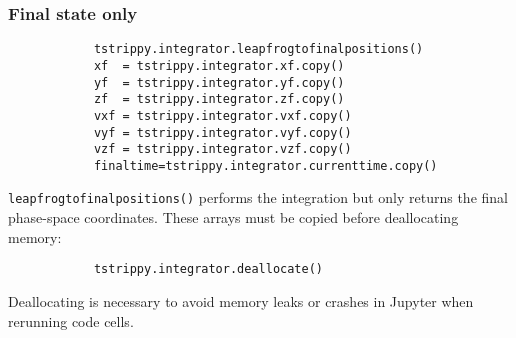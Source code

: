 \documentclass{article}
\begin{document}
        \subsubsection*{Final state only}
        \small
        \begin{lstlisting}
            tstrippy.integrator.leapfrogtofinalpositions()
            xf  = tstrippy.integrator.xf.copy()
            yf  = tstrippy.integrator.yf.copy()
            zf  = tstrippy.integrator.zf.copy()
            vxf = tstrippy.integrator.vxf.copy()
            vyf = tstrippy.integrator.vyf.copy()
            vzf = tstrippy.integrator.vzf.copy()
            finaltime=tstrippy.integrator.currenttime.copy()
        \end{lstlisting}
        \normalsize
        \texttt{leapfrogtofinalpositions()} performs the integration but only returns the final phase-space coordinates. These arrays must be copied before deallocating memory:
        \small
        \begin{lstlisting}
            tstrippy.integrator.deallocate()
        \end{lstlisting}
        \normalsize
        Deallocating is necessary to avoid memory leaks or crashes in Jupyter when rerunning code cells.





\end{document}
